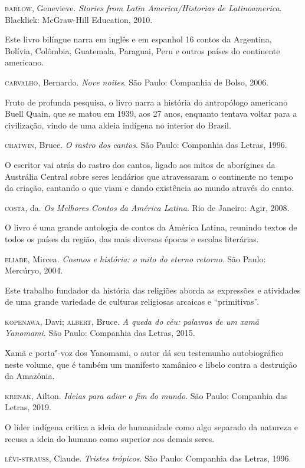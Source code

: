 \documentclass[12pt]{extarticle}
\begin{document}
{\textsc{barlow}, Genevieve. \textit{Stories from Latin America/Historias de
Latinoamerica}. Blacklick: McGraw-Hill Education, 2010.

Este livro bilíngue narra em inglês e em espanhol 16 contos da
Argentina, Bolívia, Colômbia, Guatemala, Paraguai, Peru e outros países
do continente americano.

\textsc{carvalho}, Bernardo. \textit{Nove noites}. São Paulo: Companhia de Bolso,
2006.

Fruto de profunda pesquisa, o livro narra a história do antropólogo
americano Buell Quain, que se matou em 1939, aos 27 anos, enquanto
tentava voltar para a civilização, vindo de uma aldeia indígena no
interior do Brasil.

\textsc{chatwin}, Bruce. \textit{O rastro dos cantos}. São Paulo: Companhia das
Letras, 1996.

O escritor vai atrás do rastro dos cantos, ligado aos mitos de
aborígines da Austrália Central sobre seres lendários que atravessaram
o continente no tempo da criação, cantando o que viam e dando existência
ao mundo através do canto.

\textsc{costa}, da. \textit{Os Melhores Contos da América Latina}. Rio de Janeiro: Agir,
2008.

O livro é uma grande antologia de contos da América Latina, reunindo
textos de todos os países da região, das mais diversas épocas e escolas
literárias.

\textsc{eliade}, Mircea. \textit{Cosmos e história: o mito do eterno retorno}. São
Paulo: Mercúryo, 2004.

Este trabalho fundador da história das religiões aborda as expressões e
atividades de uma grande variedade de culturas religiosas arcaicas e
``primitivas''.

\textsc{kopenawa}, Davi; \textsc{albert}, Bruce. \textit{A queda do céu: palavras de um
xamã Yanomami}. São Paulo: Companhia das Letras, 2015.

Xamã e porta"-voz dos Yanomami, o autor dá seu testemunho autobiográfico
neste volume, que é também um manifesto xamânico e libelo contra a
destruição da Amazônia.

\textsc{krenak}, Ailton. \textit{Ideias para adiar o fim do mundo}. São Paulo:
Companhia das Letras, 2019.

O líder indígena critica a ideia de humanidade como algo separado da
natureza e recusa a ideia do humano como superior aos demais seres.

\textsc{lévi-strauss}, Claude. \textit{Tristes trópicos}. São Paulo: Companhia das
Letras, 1996.

}
\end{document}
